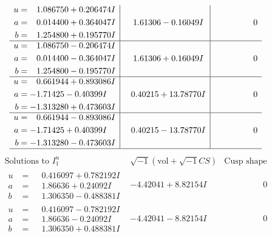 \documentclass[1p]{elsarticle_modified}
\theoremstyle{definition}
\newcommand{\I}{\sqrt{-1}}
\begin{document}
$$\begin{array}{c|c|c}
\begin{aligned}
u &= \phantom{-}1.086750 + 0.206474 I \\
a &= \phantom{-}0.014400 + 0.364047 I \\
b &= \phantom{-}1.254800 + 0.195770 I\end{aligned}
 & \phantom{-}1.61306 - 0.16049 I & \phantom{-0.000000 } 0 \\ \hline\begin{aligned}
u &= \phantom{-}1.086750 - 0.206474 I \\
a &= \phantom{-}0.014400 - 0.364047 I \\
b &= \phantom{-}1.254800 - 0.195770 I\end{aligned}
 & \phantom{-}1.61306 + 0.16049 I & \phantom{-0.000000 } 0 \\ \hline\begin{aligned}
u &= \phantom{-}0.661944 + 0.893086 I \\
a &= -1.71425 - 0.40399 I \\
b &= -1.313280 + 0.473603 I\end{aligned}
 & \phantom{-}0.40215 + 13.78770 I & \phantom{-0.000000 } 0 \\ \hline\begin{aligned}
u &= \phantom{-}0.661944 - 0.893086 I \\
a &= -1.71425 + 0.40399 I \\
b &= -1.313280 - 0.473603 I\end{aligned}
 & \phantom{-}0.40215 - 13.78770 I & \phantom{-0.000000 } 0\\
 \hline 
 \end{array}$$\newpage$$\begin{array}{c|c|c}  
\text{Solutions to }I^u_{1}& \I (\text{vol} + \sqrt{-1}CS) & \text{Cusp shape}\\
 \hline 
\begin{aligned}
u &= \phantom{-}0.416097 + 0.782192 I \\
a &= \phantom{-}1.86636 + 0.24092 I \\
b &= \phantom{-}1.306350 - 0.488381 I\end{aligned}
 & -4.42041 + 8.82154 I & \phantom{-0.000000 } 0 \\ \hline\begin{aligned}
u &= \phantom{-}0.416097 - 0.782192 I \\
a &= \phantom{-}1.86636 - 0.24092 I \\
b &= \phantom{-}1.306350 + 0.488381 I\end{aligned}
 & -4.42041 - 8.82154 I & \phantom{-0.000000 } 0 \\ \hline\begin{aligned}

\end{aligned}
\end{array}$$
\end{document}
